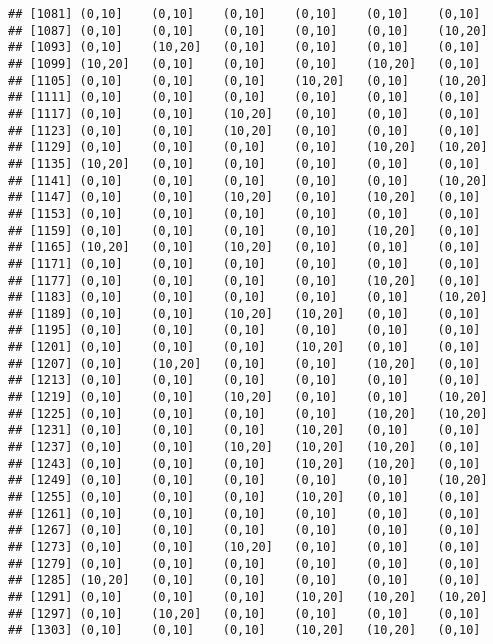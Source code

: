 \documentclass[]{article}
\begin{document}
\begin{verbatim}
## [1081] (0,10]    (0,10]    (0,10]    (0,10]    (0,10]    (0,10]   
## [1087] (0,10]    (0,10]    (0,10]    (0,10]    (0,10]    (10,20]  
## [1093] (0,10]    (10,20]   (0,10]    (0,10]    (0,10]    (0,10]   
## [1099] (10,20]   (0,10]    (0,10]    (0,10]    (10,20]   (0,10]   
## [1105] (0,10]    (0,10]    (0,10]    (10,20]   (0,10]    (10,20]  
## [1111] (0,10]    (0,10]    (0,10]    (0,10]    (0,10]    (0,10]   
## [1117] (0,10]    (0,10]    (10,20]   (0,10]    (0,10]    (0,10]   
## [1123] (0,10]    (0,10]    (10,20]   (0,10]    (0,10]    (0,10]   
## [1129] (0,10]    (0,10]    (0,10]    (0,10]    (10,20]   (10,20]  
## [1135] (10,20]   (0,10]    (0,10]    (0,10]    (0,10]    (0,10]   
## [1141] (0,10]    (0,10]    (0,10]    (0,10]    (0,10]    (10,20]  
## [1147] (0,10]    (0,10]    (10,20]   (0,10]    (10,20]   (0,10]   
## [1153] (0,10]    (0,10]    (0,10]    (0,10]    (0,10]    (0,10]   
## [1159] (0,10]    (0,10]    (0,10]    (0,10]    (10,20]   (0,10]   
## [1165] (10,20]   (0,10]    (10,20]   (0,10]    (0,10]    (0,10]   
## [1171] (0,10]    (0,10]    (0,10]    (0,10]    (0,10]    (0,10]   
## [1177] (0,10]    (0,10]    (0,10]    (0,10]    (10,20]   (0,10]   
## [1183] (0,10]    (0,10]    (0,10]    (0,10]    (0,10]    (10,20]  
## [1189] (0,10]    (0,10]    (10,20]   (10,20]   (0,10]    (0,10]   
## [1195] (0,10]    (0,10]    (0,10]    (0,10]    (0,10]    (0,10]   
## [1201] (0,10]    (0,10]    (0,10]    (10,20]   (0,10]    (0,10]   
## [1207] (0,10]    (10,20]   (0,10]    (0,10]    (10,20]   (0,10]   
## [1213] (0,10]    (0,10]    (0,10]    (0,10]    (0,10]    (0,10]   
## [1219] (0,10]    (0,10]    (10,20]   (0,10]    (0,10]    (10,20]  
## [1225] (0,10]    (0,10]    (0,10]    (0,10]    (10,20]   (10,20]  
## [1231] (0,10]    (0,10]    (0,10]    (10,20]   (0,10]    (0,10]   
## [1237] (0,10]    (0,10]    (10,20]   (10,20]   (10,20]   (0,10]   
## [1243] (0,10]    (0,10]    (0,10]    (10,20]   (10,20]   (0,10]   
## [1249] (0,10]    (0,10]    (0,10]    (0,10]    (0,10]    (10,20]  
## [1255] (0,10]    (0,10]    (0,10]    (10,20]   (0,10]    (0,10]   
## [1261] (0,10]    (0,10]    (0,10]    (0,10]    (0,10]    (0,10]   
## [1267] (0,10]    (0,10]    (0,10]    (0,10]    (0,10]    (0,10]   
## [1273] (0,10]    (0,10]    (10,20]   (0,10]    (0,10]    (0,10]   
## [1279] (0,10]    (0,10]    (0,10]    (0,10]    (0,10]    (0,10]   
## [1285] (10,20]   (0,10]    (0,10]    (0,10]    (0,10]    (0,10]   
## [1291] (0,10]    (0,10]    (0,10]    (10,20]   (10,20]   (10,20]  
## [1297] (0,10]    (10,20]   (0,10]    (0,10]    (0,10]    (0,10]   
## [1303] (0,10]    (0,10]    (0,10]    (10,20]   (10,20]   (0,10]   

\end{verbatim}
\end{document}
